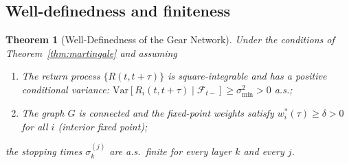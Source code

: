 \documentclass[twocolumn,11pt,a4paper]{article}
\theoremstyle{plain}
\newtheorem{theorem}{Theorem}[section]
\theoremstyle{definition}
\theoremstyle{remark}
\newcommand{\F}{\mathcal{F}}
\newcommand{\wstar}{w^{*}}
\begin{document}
\subsection{Well-definedness and finiteness}
\label{sec:gear_finiteness}

\begin{theorem}[Well-Definedness of the Gear Network]
  \label{thm:gear_finite}
  Under the conditions of Theorem~\ref{thm:martingale} and assuming
  \begin{enumerate}[label=(\roman*)]
    \item The return process $\{R(t,t+\tau)\}$ is square-integrable
          and has a positive conditional variance:
          $\mathrm{Var}[R_i(t,t+\tau)\mid\F_{t-}]\ge\sigma_{\min}^2>0$
          a.s.;
    \item The graph $G$ is connected and the fixed-point weights
          satisfy $\wstar_i(\tau)\ge\delta>0$ for all $i$
          (interior fixed point);
  \end{enumerate}
  the stopping times $\sigma_k^{(j)}$ are a.s.~finite for every layer
  $k$ and every $j$.
\end{theorem}
\end{document}
